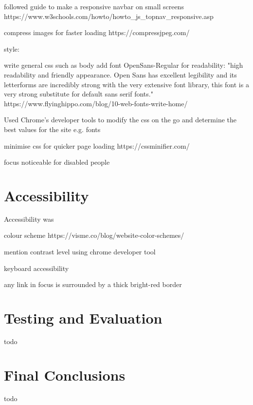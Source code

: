 \documentclass[letterpaper,12pt]{article}
\begin{document}
followed guide to make a responsive navbar on small screens https://www.w3schools.com/howto/howto_js_topnav_responsive.asp

compress images for faster loading https://compressjpeg.com/


style:

write general css such as body
add font OpenSans-Regular for readability: "high readability and friendly appearance. Open Sans has excellent legibility and its letterforms are incredibly strong with the very extensive font library, this font is a very strong substitute for default sans serif fonts." https://www.flyinghippo.com/blog/10-web-fonts-write-home/

Used Chrome's developer tools to modify the css on the go and determine the best values for the site e.g. fonts


minimise css for quicker page loading https://cssminifier.com/

focus noticeable for disabled people

\section{Accessibility}

Accessibility was 

colour scheme https://visme.co/blog/website-color-schemes/

mention contrast level using chrome developer tool

keyboard accessibility

any link in focus is surrounded by a thick bright-red border

\section{Testing and Evaluation}

todo

\section{Final Conclusions}

todo
\end{document}
